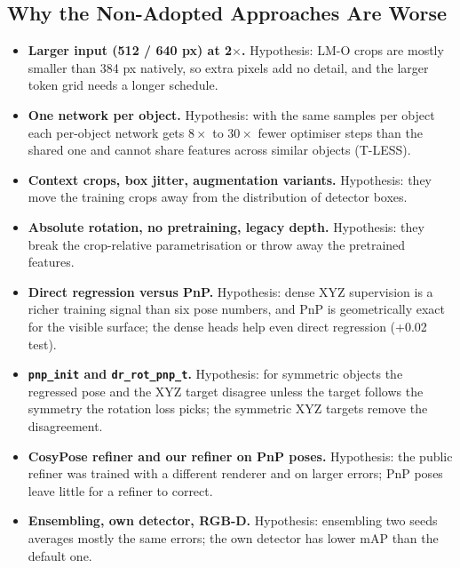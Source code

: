 \subsection{Why the Non-Adopted Approaches Are Worse}
\label{sec:catalogue:discussion}
\begin{itemize}\setlength\itemsep{1pt}
  \item \textbf{Larger input (512 / 640 px) at 2$\times$.} 
        Hypothesis: LM-O crops are mostly smaller than 384 px natively, so extra pixels add no
        detail, and the larger token grid needs a longer schedule.
  \item \textbf{One network per object.} \todo{} Hypothesis: with the same samples per object each
        per-object network gets $8\times$ to $30\times$ fewer optimiser steps than the shared one
        and cannot share features across similar objects (T-LESS).
  \item \textbf{Context crops, box jitter, augmentation variants.} \todo{} Hypothesis: they move
        the training crops away from the distribution of detector boxes.
  \item \textbf{Absolute rotation, no pretraining, legacy depth.} \todo{} Hypothesis: they break the
        crop-relative parametrisation or throw away the pretrained features.
  \item \textbf{Direct regression versus PnP.} \todo{} Hypothesis: dense XYZ supervision is a richer
        training signal than six pose numbers, and PnP is geometrically exact for the visible
        surface; the dense heads help even direct regression (+0.02 test).
  \item \textbf{\texttt{pnp\_init} and \texttt{dr\_rot\_pnp\_t}.} \todo{} Hypothesis: for symmetric
        objects the regressed pose and the XYZ target disagree unless the target follows the
        symmetry the rotation loss picks; the symmetric XYZ targets remove the disagreement.
  \item \textbf{CosyPose refiner and our refiner on PnP poses.} \todo{} Hypothesis: the public
        refiner was trained with a different renderer and on larger errors; PnP poses leave
        little for a refiner to correct.
  \item \textbf{Ensembling, own detector, RGB-D.} \todo{} Hypothesis: ensembling two seeds averages
        mostly the same errors; the own detector has lower mAP than the default one.
\end{itemize}
